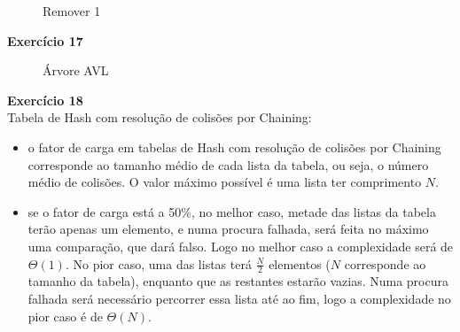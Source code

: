 \documentclass[a4paper,11pt]{article}
\begin{document}
\begin{figure}[H]
	\centering
	\caption{Remover 1}
\end{figure}

\newpage

\noindent \textbf{Exercício 17}

\begin{figure}[h]
	\centering
	\caption{Árvore AVL}
\end{figure}

\noindent \textbf{Exercício 18}\\

\noindent Tabela de Hash com resolução de colisões por Chaining:

\begin{itemize}
	\item o fator de carga em tabelas de Hash com resolução de colisões por Chaining corresponde ao tamanho médio de cada lista da tabela, ou seja, o número médio de colisões. O valor máximo possível é uma lista ter comprimento $ N $.
	\item se o fator de carga está a 50\%, no melhor caso, metade das listas da tabela terão apenas um elemento, e numa procura falhada, será feita no máximo uma comparação, que dará falso. Logo no melhor caso a complexidade será de $ \Theta(1) $. No pior caso, uma das listas terá $ \frac{N}{2} $ elementos ($ N $ corresponde ao tamanho da tabela), enquanto que as restantes estarão vazias. Numa procura falhada será necessário percorrer essa lista até ao fim, logo a complexidade no pior caso é de $ \Theta(N) $.
\end{itemize}
\end{document}

